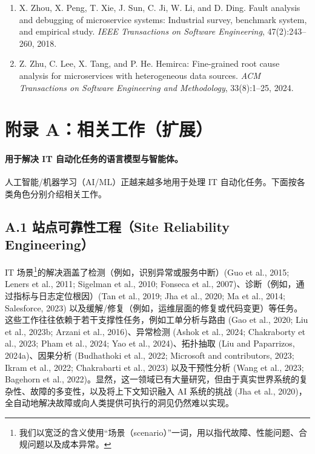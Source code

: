 \documentclass[10pt,UTF8,fontset=fandol]{ctexart}
\begin{document}
\begin{enumerate}[leftmargin=2em,itemsep=2pt]
\item X. Zhou, X. Peng, T. Xie, J. Sun, C. Ji, W. Li, and D. Ding. Fault analysis and debugging of microservice systems: Industrial survey, benchmark system, and empirical study. \textit{IEEE Transactions on Software Engineering}, 47(2):243--260, 2018.

\item Z. Zhu, C. Lee, X. Tang, and P. He. Hemirca: Fine-grained root cause analysis for microservices with heterogeneous data sources. \textit{ACM Transactions on Software Engineering and Methodology}, 33(8):1--25, 2024.

\end{enumerate}
\section{附录 A：相关工作（扩展）}

\paragraph{用于解决 IT 自动化任务的语言模型与智能体。}
人工智能/机器学习（AI/ML）正越来越多地用于处理 IT 自动化任务。下面按各类角色分别介绍相关工作。

\subsection{A.1 站点可靠性工程（Site Reliability Engineering）}

IT 场景\footnote{我们以宽泛的含义使用“场景（scenario）”一词，用以指代故障、性能问题、合规问题以及成本异常。}的解决涵盖了检测（例如，识别异常或服务中断）(Guo et al., 2015; Leners et al., 2011; Sigelman et al., 2010; Fonseca et al., 2007)、诊断（例如，通过指标与日志定位根因）(Tan et al., 2019; Jha et al., 2020; Ma et al., 2014; Salesforce, 2023) 以及缓解/修复（例如，运维层面的修复或代码变更）等任务。这些工作往往依赖于若干支撑性任务，例如工单分析与路由 (Gao et al., 2020; Liu et al., 2023b; Arzani et al., 2016)、异常检测 (Ashok et al., 2024; Chakraborty et al., 2023; Pham et al., 2024; Yao et al., 2024)、拓扑抽取 (Liu and Paparrizos, 2024a)、因果分析 (Budhathoki et al., 2022; Microsoft and contributors, 2023; Ikram et al., 2022; Chakrabarti et al., 2023) 以及干预性分析 (Wang et al., 2023; Bagehorn et al., 2022)。显然，这一领域已有大量研究，但由于真实世界系统的复杂性、故障的多变性，以及将上下文知识融入 AI 系统的挑战 (Jha et al., 2020)，全自动地解决故障或向人类提供可执行的洞见仍然难以实现。
\end{document}
